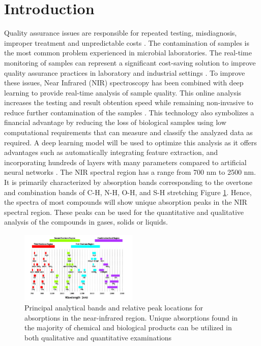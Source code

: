 \documentclass[final, 3p, 11pt]{elsarticle}
\begin{document}
\section{Introduction}
Quality assurance issues are responsible for repeated testing, misdiagnosis, improper treatment and unpredictable costs \citep{randox_quality}. The contamination of samples is the most common problem experienced in microbial laboratories. The real-time monitoring of samples can represent a significant cost-saving solution to improve quality assurance practices in laboratory and industrial settings \citep{abatenh2018contamination}. To improve these issues, Near Infrared (NIR) spectroscopy has been combined with deep learning to provide real-time analysis of sample quality. This online analysis increases the testing and result obtention speed while remaining non-invasive to reduce further contamination of the samples \citep{sohn2021gmo}. This technology also symbolizes a financial advantage by reducing the loss of biological samples using low computational requirements that can measure and classify the analyzed data as required. A deep learning model will be used to optimize this analysis as it offers advantages such as automatically integrating feature extraction, and incorporating hundreds of layers with many parameters compared to artificial neural networks \citep{mishra2022hypes}.
The NIR spectral region has a range from 700 nm to 2500 nm. It is primarily characterized by absorption bands corresponding to the overtone and combination bands of C-H, N-H, O-H, and S-H stretching Figure \ref{fig:analytical_bands}. Hence, the spectra of most compounds will show unique absorption peaks in the NIR spectral region. These peaks can be used for the quantitative and qualitative analysis of the compounds in gases, solids or liquids.

        \begin{figure}[h]
                \centering
                \includegraphics[width=0.5\textwidth]{Images/principle_analytical_bands.png}
                \caption{Principal analytical bands and relative peak locations for absorptions in the near-infrared region. Unique absorptions found in the majority of chemical and biological products can be utilized in both qualitative and quantitative examinations}
                \label{fig:analytical_bands}
                \end{figure}
\end{document}

